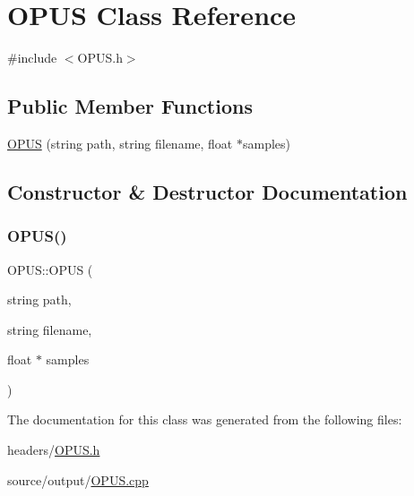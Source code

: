 \hypertarget{class_o_p_u_s}{}\section{O\+P\+US Class Reference}
\label{class_o_p_u_s}


{\ttfamily \#include $<$O\+P\+U\+S.\+h$>$}

\subsection*{Public Member Functions}
\begin{DoxyCompactItemize}
\item 
\hyperlink{class_o_p_u_s_ac55dbacce8cf692cb5160e36d6c71a4f}{O\+P\+US} (string path, string filename, float $\ast$samples)
\end{DoxyCompactItemize}


\subsection{Constructor \& Destructor Documentation}
\mbox{\label{class_o_p_u_s_ac55dbacce8cf692cb5160e36d6c71a4f}} 
\subsubsection{\texorpdfstring{O\+P\+U\+S()}{OPUS()}}
{\footnotesize\ttfamily O\+P\+U\+S\+::\+O\+P\+US (\begin{DoxyParamCaption}\item[{string}]{path,  }\item[{string}]{filename,  }\item[{float $\ast$}]{samples }\end{DoxyParamCaption})}



The documentation for this class was generated from the following files\+:\begin{DoxyCompactItemize}
\item 
headers/\hyperlink{_o_p_u_s_8h}{O\+P\+U\+S.\+h}\item 
source/output/\hyperlink{_o_p_u_s_8cpp}{O\+P\+U\+S.\+cpp}\end{DoxyCompactItemize}
